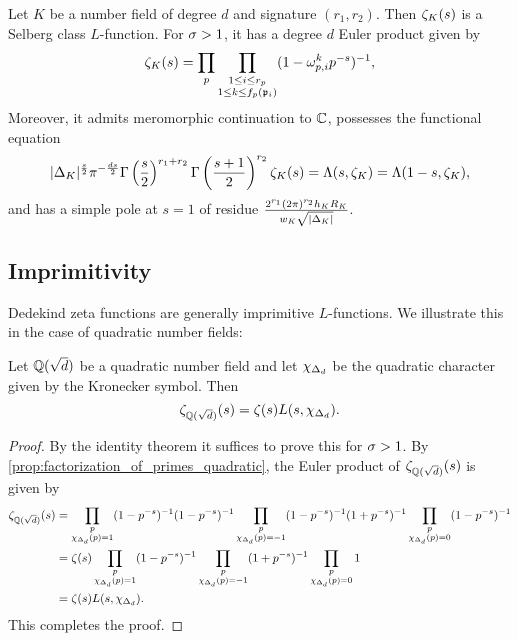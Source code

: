       \begin{theorem}\label{thm:Dedekind_Selberg}
        Let $K$ be a number field of degree $d$ and signature $(r_{1},r_{2})$. Then $\zeta_{K}(s)$ is a Selberg class $L$-function. For $\sigma > 1$, it has a degree $d$ Euler product given by
        \[
          \zeta_{K}(s) = \prod_{p}\prod_{\substack{1 \le i \le r_{p} \\ 1 \le k \le f_{p}(\mathfrak{p}_{i})}}(1-\omega_{p,i}^{k}p^{-s})^{-1},
        \]
        Moreover, it admits meromorphic continuation to $\mathbb{C}$, possesses the functional equation
        \[
          |\Delta_{K}|^{\frac{s}{2}}\pi^{-\frac{ds}{2}}\Gamma\left(\frac{s}{2}\right)^{r_{1}+r_{2}}\Gamma\left(\frac{s+1}{2}\right)^{r_{2}}\zeta_{K}(s) = \Lambda(s,\zeta_{K}) = \Lambda(1-s,\zeta_{K}),
        \]
        and has a simple pole at $s = 1$ of residue $\frac{2^{r_{1}}(2\pi)^{r_{2}}h_{K}R_{K}}{w_{K}\sqrt{|\Delta_{K}|}}$.
      \end{theorem}
    \subsection*{Imprimitivity}
      Dedekind zeta functions are generally imprimitive $L$-functions. We illustrate this in the case of quadratic number fields:

      \begin{theorem}\label{thm:factorization_of_Dedekind_of_quadratic_number_field}
        Let $\mathbb{Q}(\sqrt{d})$ be a quadratic number field and let $\chi_{\Delta_{d}}$ be the quadratic character given by the Kronecker symbol. Then
        \[
          \zeta_{\mathbb{Q}(\sqrt{d})}(s) = \zeta(s)L(s,\chi_{\Delta_{d}}).
        \]
      \end{theorem}
      \begin{proof}
        By the identity theorem it suffices to prove this for $\sigma > 1$. By \cref{prop:factorization_of_primes_quadratic}, the Euler product of $\zeta_{\mathbb{Q}(\sqrt{d})}(s)$ is given by
        \begin{align*}
          \zeta_{\mathbb{Q}(\sqrt{d})}(s) &= \prod_{\substack{p \\ \chi_{\Delta_{d}}(p) = 1}}(1-p^{-s})^{-1}(1-p^{-s})^{-1}\prod_{\substack{p \\ \chi_{\Delta_{d}}(p) = -1}}(1-p^{-s})^{-1}(1+p^{-s})^{-1}\prod_{\substack{p \\ \chi_{\Delta_{d}}(p) = 0}}(1-p^{-s})^{-1} \\
          &= \zeta(s)\prod_{\substack{p \\ \chi_{\Delta_{d}}(p) = 1}}(1-p^{-s})^{-1}\prod_{\substack{p \\ \chi_{\Delta_{d}}(p) = -1}}(1+p^{-s})^{-1}\prod_{\substack{p \\ \chi_{\Delta_{d}}(p) = 0}}1 \\
          &= \zeta(s)L(s,\chi_{\Delta_{d}}).
        \end{align*}
        This completes the proof.
      \end{proof}

